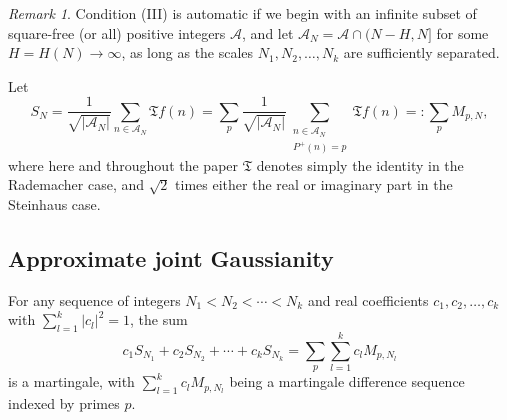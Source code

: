\documentclass[11pt]{tran-l}
\theoremstyle{definition}
\theoremstyle{remark}
\newtheorem{remark}[theorem]{Remark}
\numberwithin{equation}{section}
\begin{document}
\begin{remark}
    Condition (III) is automatic if we begin with an infinite subset of square-free (or all) positive integers $\mathcal A$, and let $\mathcal A_N = \mathcal A \cap(N-H, N]$ for some $H=H(N)\to\infty$, as long as the scales $N_1, N_2, \ldots, N_k$ are sufficiently separated. 
\end{remark}
Let
\begin{equation}\label{eq:S_Ndef}
    S_N = \frac{1}{\sqrt{\lvert \mathcal A_N\rvert}}\sum_{n\in\mathcal A_N} \mathfrak Tf(n) = \sum_{p} \frac{1}{\sqrt{\lvert \mathcal A_N\rvert}} \sum_{\substack{n\in\mathcal A_N \\ P^+(n) = p}} \mathfrak Tf(n) =: \sum_{p} M_{p, N},
\end{equation}
where here and throughout the paper $\mathfrak T$ denotes simply the identity in the Rademacher case, and $\sqrt2$ times either the real or imaginary part in the Steinhaus case. 

\subsection{Approximate joint Gaussianity}
For any sequence of integers $N_1< N_2< \cdots< N_k$ and real coefficients $c_1, c_2, \ldots, c_k$ with $\sum_{l=1}^k \lvert c_l\rvert^2 = 1$, the sum 
\begin{equation*}
    c_1S_{N_1} + c_2S_{N_2} + \cdots + c_kS_{N_k} = \sum_p \sum_{l=1}^k c_lM_{p, N_l}
\end{equation*} is a martingale, with $\sum_{l=1}^k c_lM_{p, N_l}$ being a martingale difference sequence indexed by primes $p$. 
\end{document}
